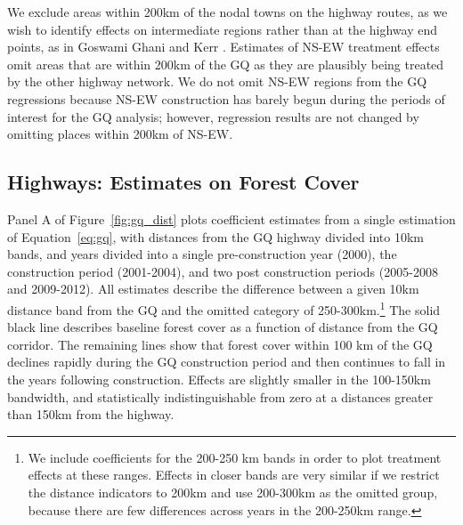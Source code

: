 We exclude areas within 200km of the nodal towns on the highway
routes, as we wish to identify effects on intermediate regions rather
than at the highway end points, as in Goswami Ghani and Kerr
\cite{GGK16}. Estimates of NS-EW treatment effects omit areas that are
within 200km of the GQ as they are plausibly being treated by the
other highway network. We do not omit NS-EW regions from the GQ
regressions because NS-EW construction has barely begun during the
periods of interest for the GQ analysis; however, regression results
are not changed by omitting places within 200km of NS-EW.

\subsection{Highways: Estimates on Forest Cover}
\label{sec:highway_results}

Panel A of Figure~\ref{fig:gq_dist} plots coefficient estimates from a
single estimation of Equation~\ref{eq:gq}, with distances from the
GQ highway divided into 10km bands, and years divided into a
single pre-construction year (2000), the construction period
(2001-2004), and two post construction periods (2005-2008 and
2009-2012). All estimates describe the difference between a given 10km
distance band from the GQ and the omitted category of
250-300km.\footnote{We include coefficients for the 200-250 km bands
  in order to plot treatment effects at these ranges. Effects in
  closer bands are very similar if we restrict the distance indicators
  to 200km and use 200-300km as the omitted group, because there are
  few differences across years in the 200-250km range.}  The solid
black line describes baseline forest cover as a function of distance
from the GQ corridor. The remaining lines show that forest cover
within 100 km of the GQ declines rapidly during the GQ construction
period and then continues to fall in the years following
construction. Effects are slightly smaller in the 100-150km bandwidth,
and statistically indistinguishable from zero at a distances greater than 150km from
the highway.


